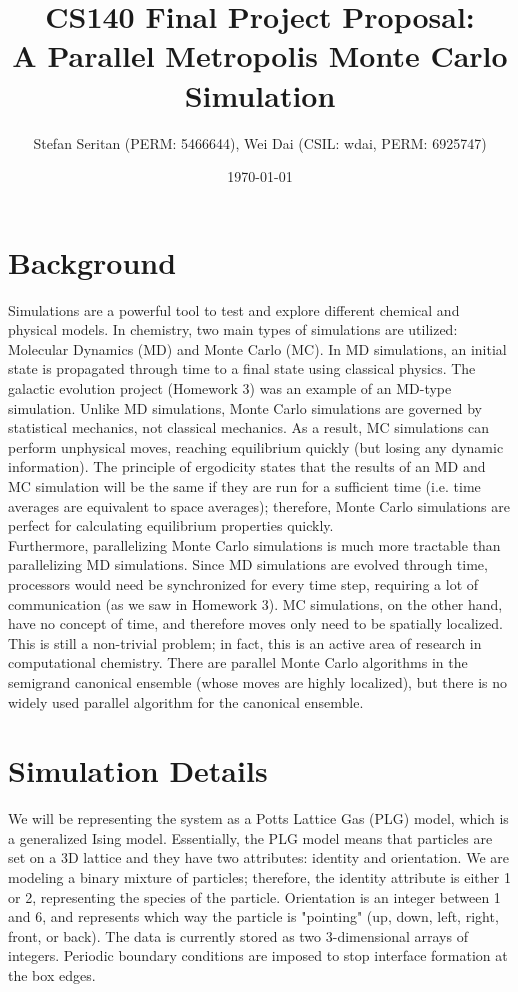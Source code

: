 \documentclass{article}
\author{Stefan Seritan (PERM: 5466644), Wei Dai (CSIL: wdai, PERM: 6925747)}
\date{\today}
\title{CS140 Final Project Proposal:\\A Parallel Metropolis Monte Carlo Simulation}
\begin{document}
\maketitle

\section*{Background}
\vspace{-7pt}
\indent\indent Simulations are a powerful tool to test and explore different chemical and physical models. In chemistry, two main types of simulations are utilized: Molecular Dynamics (MD) and Monte Carlo (MC). In MD simulations, an initial state is propagated through time to a final state using classical physics. The galactic evolution project (Homework 3) was an example of an MD-type simulation. Unlike MD simulations, Monte Carlo simulations are governed by statistical mechanics, not classical mechanics. As a result, MC simulations can perform unphysical moves, reaching equilibrium quickly (but losing any dynamic information). The principle of ergodicity states that the results of an MD and MC simulation will be the same if they are run for a sufficient time (i.e. time averages are equivalent to space averages); therefore, Monte Carlo simulations are perfect for calculating equilibrium properties quickly.\\
\indent Furthermore, parallelizing Monte Carlo simulations is much more tractable than parallelizing MD simulations. Since MD simulations are evolved through time, processors would need be synchronized for every time step, requiring a lot of communication (as we saw in Homework 3). MC simulations, on the other hand, have no concept of time, and therefore moves only need to be spatially localized. This is still a non-trivial problem; in fact, this is an active area of research in computational chemistry. There are parallel Monte Carlo algorithms in the semigrand canonical ensemble (whose moves are highly localized), but there is no widely used parallel algorithm for the canonical ensemble.

\section*{Simulation Details}
\vspace{-7pt}
\indent\indent We will be representing the system as a Potts Lattice Gas (PLG) model, which is a generalized Ising model. Essentially, the PLG model means that particles are set on a 3D lattice and they have two attributes: identity and orientation. We are modeling a binary mixture of particles; therefore, the identity attribute is either 1 or 2, representing the species of the particle. Orientation is an integer between 1 and 6, and represents which way the particle is "pointing" (up, down, left, right, front, or back). The data is currently stored as two 3-dimensional arrays of integers. Periodic boundary conditions are imposed to stop interface formation at the box edges.
\end{document}
